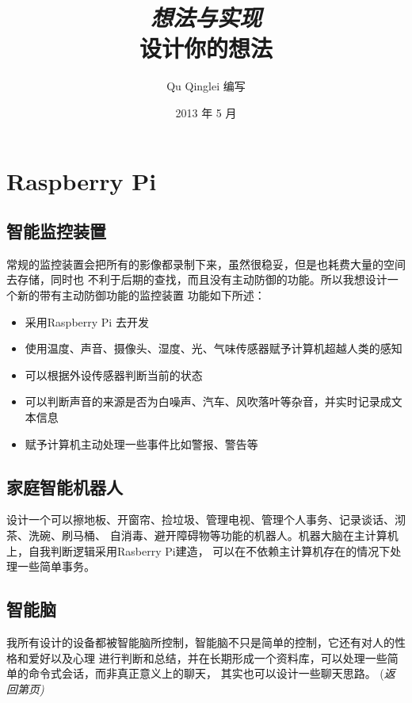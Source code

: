 \documentclass{article}
\begin{document}
\title{%
  {\huge \textit{想法与实现}\\\smallskip}%
  {\small \textsf{设计你的想法}}
}

\author{Qu Qinglei 编写 \\[3mm]
       }

\date{2013 年 5 月}

\maketitle

\begin{multicols}{2}
\tableofcontents
\label{sec:firstPage}
\end{multicols}

\section{Raspberry Pi}
\subsection{智能监控装置}
常规的监控装置会把所有的影像都录制下来，虽然很稳妥，但是也耗费大量的空间去存储，同时也
不利于后期的查找，而且没有主动防御的功能。所以我想设计一个新的带有主动防御功能的监控装置
功能如下所述：
\begin{itemize}
\item 采用Raspberry Pi 去开发
\item 使用温度、声音、摄像头、湿度、光、气味传感器赋予计算机超越人类的感知
\item 可以根据外设传感器判断当前的状态
\item 可以判断声音的来源是否为白噪声、汽车、风吹落叶等杂音，并实时记录成文本信息
\item 赋予计算机主动处理一些事件比如警报、警告等
\end{itemize}

\subsection{家庭智能机器人}
设计一个可以擦地板、开窗帘、捡垃圾、管理电视、管理个人事务、记录谈话、沏茶、洗碗、刷马桶、
自消毒、避开障碍物等功能的机器人。机器大脑在主计算机上，自我判断逻辑采用Rasberry Pi建造，
可以在不依赖主计算机存在的情况下处理一些简单事务。

\subsection{智能脑}
我所有设计的设备都被智能脑所控制，智能脑不只是简单的控制，它还有对人的性格和爱好以及心理
进行判断和总结，并在长期形成一个资料库，可以处理一些简单的命令式会话，而非真正意义上的聊天，
其实也可以设计一些聊天思路。
{(\it{返回第\pageref{sec:firstPage}页})}
\end{document}
